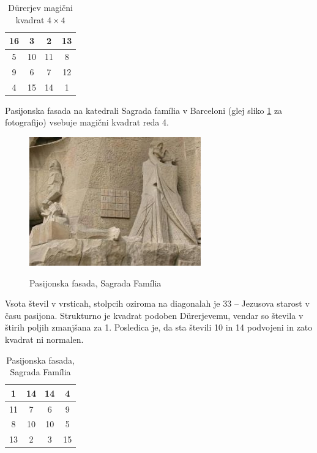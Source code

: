 \documentclass[a4paper,12pt]{article}
\begin{document}
\begin{table}
   \caption{Dürerjev magični kvadrat $4\times 4$}
   \label{table:durer}
   \large
   \centering
   \begin{tabular}{|c|c|c|c|}
      \hline
      16 &  3 &  2 & 13 \\ \hline
      5 & 10 & 11 &  8 \\ \hline
      9 &  6 &  7 & 12 \\ \hline
      4 & 15 & 14 &  1 \\ \hline
   \end{tabular}
\end{table}

Pasijonska fasada na katedrali Sagrada família v Barceloni
(glej sliko \ref{fig:sagrada} za fotografijo) vsebuje magični kvadrat reda 4.
\begin{figure}[!ht]
   \centering
   \caption{Pasijonska fasada, Sagrada Família}
   \includegraphics{sagrada.png}
   \label{fig:sagrada}
\end{figure}


Vsota števil v vrsticah, stolpcih oziroma na diagonalah je 33 -- Jezusova starost
v času pasijona. Strukturno je kvadrat podoben Dürerjevemu, vendar so števila
v štirih poljih zmanjšana za 1. Posledica je, da sta števili 10 in 14 podvojeni
in zato kvadrat ni normalen.
%

\begin{table}
   \caption{Pasijonska fasada, Sagrada Família}
   \label{table:sagrada}
   \large
   \centering
   \begin{tabular}{|c|c|c|c|}
      \hline
       1 & 14 & 14 &  4 \\\hline
      11 &  7 &  6 &  9 \\\hline
       8 & 10 & 10 &  5 \\\hline
      13 &  2 &  3 & 15 \\\hline
   \end{tabular}
\end{table}
\end{document}
